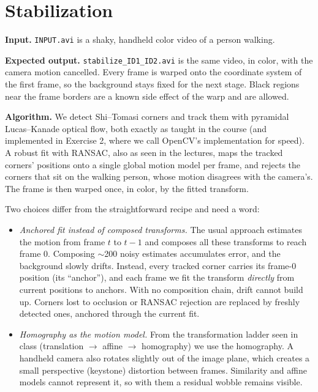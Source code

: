 \documentclass[11pt]{article}
\begin{document}
\section{Stabilization}

\noindent
\textbf{Input.} \texttt{INPUT.avi} is a shaky, handheld color video of a person walking.

\medskip
\noindent
\textbf{Expected output.} \texttt{stabilize\_ID1\_ID2.avi} is the same video, in color, with the
camera motion cancelled. Every frame is warped onto the coordinate system of the first frame, so
the background stays fixed for the next stage. Black regions near the frame borders are a known
side effect of the warp and are allowed.

\medskip
\noindent
\textbf{Algorithm.} We detect Shi--Tomasi corners and track them with pyramidal Lucas--Kanade
optical flow, both exactly as taught in the course (and implemented in Exercise 2, where we call
OpenCV's implementation for speed). A robust fit with RANSAC, also as seen in the lectures, maps
the tracked corners' positions onto a single global motion model per frame, and rejects the
corners that sit on the walking person, whose motion disagrees with the camera's. The frame is
then warped once, in color, by the fitted transform.

Two choices differ from the straightforward recipe and need a word:

\begin{itemize}[nosep]
    \item \emph{Anchored fit instead of composed transforms.} The usual approach estimates the
    motion from frame $t$ to $t-1$ and composes all these transforms to reach frame $0$. Composing
    $\sim$200 noisy estimates accumulates error, and the background slowly drifts. Instead, every
    tracked corner carries its frame-0 position (its ``anchor''), and each frame we fit the
    transform \emph{directly} from current positions to anchors. With no composition chain, drift
    cannot build up. Corners lost to occlusion or RANSAC rejection are replaced by freshly
    detected ones, anchored through the current fit.
    \item \emph{Homography as the motion model.} From the transformation ladder seen in class
    (translation $\to$ affine $\to$ homography) we use the homography. A handheld camera also
    rotates slightly out of the image plane, which creates a small perspective (keystone)
    distortion between frames. Similarity and affine models cannot represent it, so with them a
    residual wobble remains visible.
\end{itemize}
\end{document}
